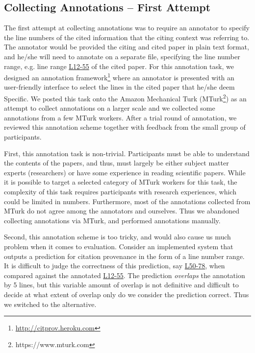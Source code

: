 \subsection*{Collecting Annotations -- First Attempt}
The first attempt at collecting annotations was to require an annotator to specify the line numbers of the cited information that the citing context was referring to. The annotator would be provided the citing and cited paper in plain text format, and he/she will need to annotate on a separate file, specifying the line number range, e.g. line range \url{L12-55} of the cited paper. For this annotation task, we designed an annotation framework\footnote{\url{http://citprov.heroku.com}} where an annotator is presented with an user-friendly interface to select the lines in the cited paper that he/she deem Specific. We posted this task onto the Amazon Mechanical Turk (MTurk\footnote{https://www.mturk.com}) as an attempt to collect annotations on a larger scale and we collected some annotations from a few MTurk workers. After a trial round of annotation, we reviewed this annotation scheme together with feedback from the small group of participants.

First, this annotation task is non-trivial. Participants must be able to understand the contents of the papers, and thus, must largely be either subject matter experts (researchers) or have some experience in reading scientific papers. While it is possible to target a selected category of MTurk workers for this task, the complexity of this task requires participants with research experiences, which could be limited in numbers. Furthermore, most of the annotations collected from MTurk do not agree among the annotators and ourselves. Thus we abandoned collecting annotations via MTurk, and performed annotations manually.

Second, this annotation scheme is too tricky, and would also cause us much problem when it comes to evaluation. Consider an implemented system that outputs a prediction for citation provenance in the form of a line number range. It is difficult to judge the correctness of this prediction, say \url{L50-78}, when compared against the annotated \url{L12-55}. The prediction \textit{overlaps} the annotation by 5 lines, but this variable amount of overlap is not definitive and difficult to decide at what extent of overlap only do we consider the prediction correct. Thus we switched to the alternative.

